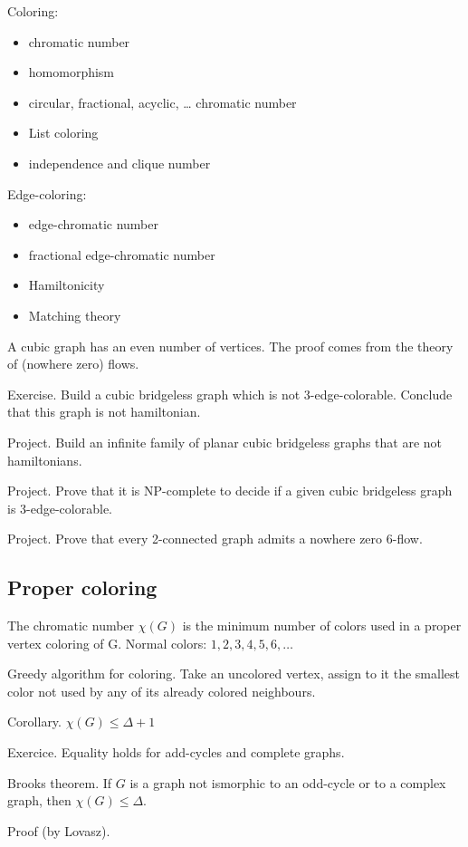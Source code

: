 \documentclass[12pt,a4paper]{article}
\begin{document}
Coloring:
\begin{itemize}
\item chromatic number
\item homomorphism
\item circular, fractional, acyclic, … chromatic number
\item List coloring
\item independence and clique number
\end{itemize}

Edge-coloring:
\begin{itemize}
\item edge-chromatic number
\item fractional edge-chromatic number
\item Hamiltonicity
\item Matching theory
\end{itemize}

A cubic graph has an even number of vertices. The proof comes from the theory of
(nowhere zero) flows.

Exercise. Build a cubic bridgeless graph which is not 3-edge-colorable. Conclude
that this graph is not hamiltonian.

Project. Build an infinite family of planar cubic bridgeless graphs that are not
hamiltonians.

Project. Prove that it is NP-complete to decide if a given cubic bridgeless
graph is 3-edge-colorable.

Project. Prove that every 2-connected graph admits a nowhere zero 6-flow.

\subsection{Proper coloring}

The chromatic number \(\chi(G)\) is the minimum number of colors used in a
proper vertex coloring of G. Normal colors: \(1, 2, 3, 4, 5, 6, \dots\)

Greedy algorithm for coloring.  Take an uncolored vertex, assign to it the
smallest color not used by any of its already colored neighbours.

Corollary. \(\chi(G) \leq \Delta + 1\)

Exercice. Equality holds for add-cycles and complete graphs.

Brooks theorem. If \(G\) is a graph not ismorphic to an odd-cycle or to a
complex graph, then \(\chi(G) \leq \Delta\).

Proof (by Lovasz).
\end{document}
